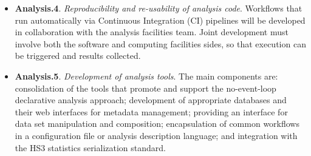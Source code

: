 \begin{itemize}
\item{\bf Analysis.4}. {\em Reproducibility and re-usability of analysis code}. Workflows that run automatically via Continuous Integration (CI) pipelines will be developed in collaboration with the analysis facilities team. Joint development must involve both the software and computing facilities sides, so that execution can be triggered and results collected.

\item{\bf Analysis.5}. {\em Development of analysis tools}. 
The main components are: consolidation of the tools that promote and support the no-event-loop declarative analysis approach; development of appropriate databases and their web interfaces for metadata management; providing an interface for data set manipulation and composition; encapsulation of common workflows in a configuration file or analysis description language; and integration with the HS3 statistics serialization standard.
\end{itemize}

